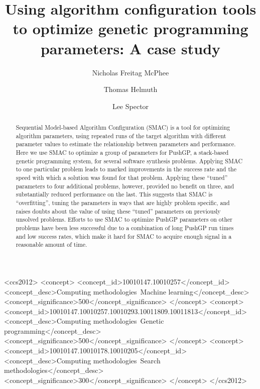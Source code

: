 \documentclass[sigconf]{acmart}
\begin{document}
\title[Using algorithm configuration tools to optimize genetic programming parameters]{Using algorithm configuration tools to optimize genetic programming parameters: A case study}

\author{Nicholas Freitag McPhee}

\author{Thomas Helmuth}

\author{Lee Spector}

\begin{abstract}
	Sequential Model-based Algorithm Configuration (SMAC) is a
	tool for optimizing algorithm parameters, using repeated runs
	of the target algorithm with different parameter values to estimate
	the relationship between parameters and performance. 
	Here we use SMAC to optimize
	a group of parameters for PushGP, a stack-based genetic programming
	system, for
	several software synthesis problems. Applying
	SMAC to one particular problem leads
	to marked improvements in the success rate and the speed with which
	a solution was found for that problem. Applying these ``tuned'' 
	parameters to four
	additional problems, however, provided no benefit on three, and
	substantially reduced performance on the last. This suggests that SMAC 
	is ``overfitting'', tuning the parameters in ways that are 
	highly problem specific, and raises doubts about the value of
	using these ``tuned'' parameters on  previously unsolved problems.
	Efforts to use SMAC to optimize PushGP parameters on other problems
	have been less successful due to a combination of long PushGP run times
	and low success rates, which make it hard for SMAC to acquire enough
	signal in a reasonable amount of time.
\end{abstract}

%
%
\begin{CCSXML}
	<ccs2012>
	<concept>
	<concept_id>10010147.10010257</concept_id>
	<concept_desc>Computing methodologies~Machine learning</concept_desc>
	<concept_significance>500</concept_significance>
	</concept>
	<concept>
	<concept_id>10010147.10010257.10010293.10011809.10011813</concept_id>
	<concept_desc>Computing methodologies~Genetic programming</concept_desc>
	<concept_significance>500</concept_significance>
	</concept>
	<concept>
	<concept_id>10010147.10010178.10010205</concept_id>
	<concept_desc>Computing methodologies~Search methodologies</concept_desc>
	<concept_significance>300</concept_significance>
	</concept>
	</ccs2012>
\end{CCSXML}
\end{document}
